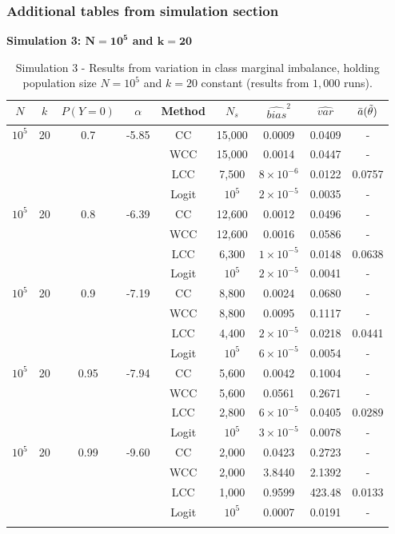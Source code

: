 \subsubsection{Additional tables from simulation section}

\textbf{Simulation 3: $\mathbf{N=10^5}$ and $\mathbf{k=20}$}

\begin{longtable}{ccccccccc}
\toprule
$N$ & $k$ & $P(Y=0)$ & $\alpha$ & Method & $N_s$ & $\widehat{bias}^2$ & $\widehat{var}$ & $\Bar{a}(\Tilde{\theta})$\\
\midrule
$10^5$ & 20 & 0.7 & -5.85 & CC & 15,000 & 0.0009 & 0.0409 & - \\
 & & & & WCC & 15,000 & 0.0014 & 0.0447 & - \\
 & & & & LCC & 7,500 & $8\times10^{-6}$ & 0.0122 & 0.0757\\
 & & & & Logit & $10^5$ & $2\times10^{-5}$ & 0.0035 & -\\
 \midrule
$10^5$ & 20 & 0.8 & -6.39 & CC & 12,600  & 0.0012 & 0.0496 & -\\
 & & & & WCC & 12,600 & 0.0016 & 0.0586 & - \\
 & & & & LCC & 6,300 & $1\times10^{-5}$ & 0.0148 & 0.0638 \\
 & & & & Logit & $10^5$ & $2\times10^{-5}$ & 0.0041 & -\\
\midrule
$10^5$ & 20 & 0.9 & -7.19 & CC & 8,800 & 0.0024 & 0.0680 & - \\
 & & & & WCC & 8,800 & 0.0095 & 0.1117 & -\\
 & & & & LCC & 4,400 & $2\times10^{-5}$ & 0.0218 & 0.0441 \\
 & & & & Logit & $10^5$ & $6\times10^{-5}$ & 0.0054 & -\\
 \midrule
$10^5$ & 20 & 0.95 & -7.94 & CC & 5,600 & 0.0042 & 0.1004 & - \\
 & & & & WCC & 5,600 & 0.0561 & 0.2671 & -\\
 & & & & LCC & 2,800 & $6\times10^{-5}$ & 0.0405 & 0.0289 \\
 & & & & Logit & $10^5$ & $3\times10^{-5}$ & 0.0078 & -\\
 \midrule
$10^5$ & 20 & 0.99 & -9.60 & CC & 2,000 & 0.0423 & 0.2723 & - \\
 & & & & WCC & 2,000 & 3.8440 & 2.1392 & -\\
 & & & & LCC & 1,000 & 0.9599 & 423.48 & 0.0133 \\
 & & & & Logit & $10^5$ & 0.0007 & 0.0191 & -\\
\bottomrule
\caption[Simulation 3 - Increasing marginal imbalance for $N=10^5$ and $k=20$]{Simulation 3 - Results from variation in class marginal imbalance, holding population size $N=10^5$ and $k=20$ constant (results from $1,000$ runs).}
\label{tab:sim_prob_a3}
\end{longtable}



